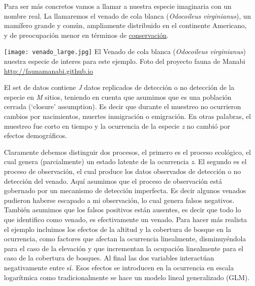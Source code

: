 \documentclass[
]{book}
\begin{document}
Para ser más concretos vamos a llamar a nuestra especie imaginaria con un nombre real. La llamaremos el venado de cola blanca (\emph{Odocoileus virginianus}), un mamífero grande y común, ampliamente distribuido en el continente Americano, y de preocupación menor en términos de \href{http://www.iucnredlist.org/details/42394}{conservación}.

\texttt{[image: venado\_large.jpg]}
El Venado de cola blanca (\emph{Odocoileus virginianus}) nuestra especie de interes para este ejemplo. Foto del proyecto fauna de Manabi \url{http://faunamanabi.github.io}

El set de datos contiene \emph{J} datos replicados de detección o no detección de la especie en \emph{M} sitios, teniendo en cuenta que asumimos que es una población cerrada (`closure' assumption). Es decir que durante el muestreo no ocurrieron cambios por nacimientos, muertes inmigración o emigración. En otras palabras, el muestreo fue corto en tiempo y la ocurrencia de la especie \emph{z} no cambió por efectos demográficos.

Claramente debemos distinguir dos procesos, el primero es el proceso ecológico, el cual genera (parcialmente) un estado latente de la ocurrencia \emph{z}. El segundo es el proceso de observación, el cual produce los datos observados de detección o no detección del venado. Aquí asumimos que el proceso de observación está gobernado por un mecanismo de detección imperfecta. Es decir algunos venados pudieron haberse escapado a mi observación, lo cual genera falsos negativos. También asumimos que los falsos positivos están ausentes, es decir que todo lo que identifico como venado, es efectivamente un venado. Para hacer más realista el ejemplo incluimos los efectos de la altitud y la cobertura de bosque en la ocurrencia, como factores que afectan la ocurrencia linealmente, disminuyéndola para el caso de la elevación y que incrementan la ocupación linealmente para el caso de la cobertura de bosques. Al final las dos variables interactúan negativamente entre sí. Esos efectos se introducen en la ocurrencia en escala logarítmica como tradicionalmente se hace un modelo lineal generalizado (GLM).
\end{document}

